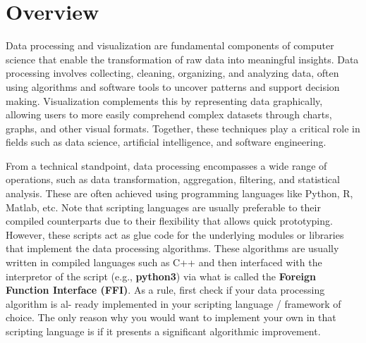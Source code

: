 \section{Overview}

Data processing and visualization are fundamental components of computer science
that enable the transformation of raw data into meaningful insights. Data
processing involves collecting, cleaning, organizing, and analyzing data, often
using algorithms and software tools to uncover patterns and support decision
making. Visualization complements this by representing data graphically,
allowing users to more easily comprehend complex datasets through charts,
graphs, and other visual formats. Together, these techniques play a critical
role in fields such as data science, artificial intelligence, and software
engineering.

From a technical standpoint, data processing encompasses a wide range of
operations, such as data transformation, aggregation, filtering, and statistical
analysis. These are often achieved using programming languages like Python,
R, Matlab, etc. Note that scripting languages are usually preferable to their
compiled counterparts due to their flexibility that allows quick prototyping.
However, these scripts act as glue code for the underlying modules or libraries
that implement the data processing algorithms. These algorithms are usually
written in compiled languages such as C++ and then interfaced with the
interpretor of the script (e.g., \textbf{python3}) via what is called the
\textbf{Foreign Function Interface (FFI)}. As a rule, first check if your data
processing algorithm is al- ready implemented in your scripting language /
framework of choice. The only reason why you would want to implement your own in
that scripting language is if it presents a significant algorithmic improvement.
